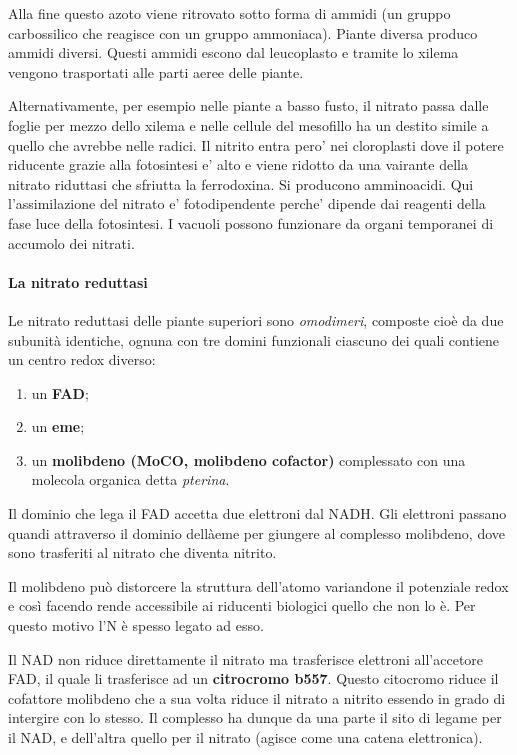 \documentclass[]{article}
\begin{document}
Alla fine questo azoto viene ritrovato sotto forma di ammidi (un gruppo
carbossilico che reagisce con un gruppo ammoniaca). Piante diversa
produco ammidi diversi. Questi ammidi escono dal leucoplasto e tramite
lo xilema vengono trasportati alle parti aeree delle piante.

Alternativamente, per esempio nelle piante a basso fusto, il nitrato
passa dalle foglie per mezzo dello xilema e nelle cellule del mesofillo
ha un destito simile a quello che avrebbe nelle radici. Il nitrito entra
pero' nei cloroplasti dove il potere riducente grazie alla fotosintesi
e' alto e viene ridotto da una vairante della nitrato riduttasi che
sfriutta la ferrodoxina. Si producono amminoacidi. Qui l'assimilazione
del nitrato e' fotodipendente perche' dipende dai reagenti della fase
luce della fotosintesi. I vacuoli possono funzionare da organi
temporanei di accumolo dei nitrati.

\paragraph{La nitrato reduttasi}\label{la-nitrato-reduttasi}

Le nitrato reduttasi delle piante superiori sono \emph{omodimeri},
composte cioè da due subunità identiche, ognuna con tre domini
funzionali ciascuno dei quali contiene un centro redox diverso:

\begin{enumerate}
\def\labelenumi{\arabic{enumi}.}
\itemsep1pt\parskip0pt
\item
  un \textbf{FAD};
\item
  un \textbf{eme};
\item
  un \textbf{molibdeno (MoCO, molibdeno cofactor)} complessato con una
  molecola organica detta \emph{pterina}.
\end{enumerate}

Il dominio che lega il FAD accetta due elettroni dal NADH. Gli elettroni
passano quandi attraverso il dominio dellàeme per giungere al complesso
molibdeno, dove sono trasferiti al nitrato che diventa nitrito.

Il molibdeno può distorcere la struttura dell'atomo variandone il
potenziale redox e così facendo rende accessibile ai riducenti biologici
quello che non lo è. Per questo motivo l'N è spesso legato ad esso.

Il NAD non riduce direttamente il nitrato ma trasferisce elettroni
all'accetore FAD, il quale li trasferisce ad un \textbf{citrocromo
b557}. Questo citocromo riduce il cofattore molibdeno che a sua volta
riduce il nitrato a nitrito essendo in grado di intergire con lo stesso.
Il complesso ha dunque da una parte il sito di legame per il NAD, e
dell'altra quello per il nitrato (agisce come una catena elettronica).
\end{document}
